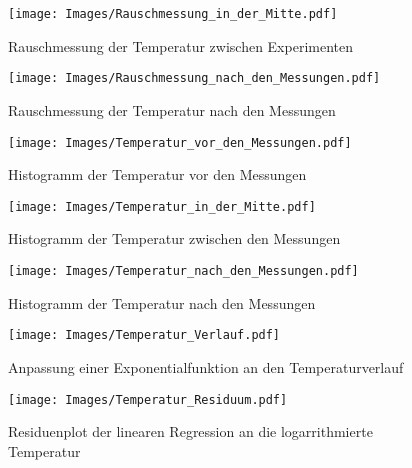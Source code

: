 \documentclass[]{article}
\begin{document}
	\begin{figure}
	\begin{center}
		\texttt{[image: Images/Rauschmessung\_in\_der\_Mitte.pdf]}
		\caption{Rauschmessung der Temperatur zwischen Experimenten}
		\label{Temp_mitte}
	\end{center}
	\end{figure}

	\begin{figure}
	\begin{center}
		\texttt{[image: Images/Rauschmessung\_nach\_den\_Messungen.pdf]}
		\caption{Rauschmessung der Temperatur nach den Messungen}
		\label{Temp_hinten}
	\end{center}
	\end{figure}

	\begin{figure}
	\begin{center}
		\texttt{[image: Images/Temperatur\_vor\_den\_Messungen.pdf]}
		\caption{Histogramm der Temperatur vor den Messungen}
		\label{Temp_vorn_hist}
	\end{center}
	\end{figure}

	\begin{figure}
	\begin{center}
		\texttt{[image: Images/Temperatur\_in\_der\_Mitte.pdf]}
		\caption{Histogramm der Temperatur zwischen den Messungen}
		\label{Temp_mitte_hist}
	\end{center}
	\end{figure}

	\begin{figure}
	\begin{center}
		\texttt{[image: Images/Temperatur\_nach\_den\_Messungen.pdf]}
		\caption{Histogramm der Temperatur nach den Messungen}
		\label{Temp_hinten_hist}
	\end{center}
	\end{figure}

	\begin{figure}
	\begin{center}
		\texttt{[image: Images/Temperatur\_Verlauf.pdf]}
		\caption{Anpassung einer Exponentialfunktion an den Temperaturverlauf}
		\label{Temp_Fit}
	\end{center}
	\end{figure}

	\begin{figure}
	\begin{center}
		\texttt{[image: Images/Temperatur\_Residuum.pdf]}
		\caption{Residuenplot der linearen Regression an die logarrithmierte Temperatur}
		\label{Temp_Res}
	\end{center}
	\end{figure}




	
\end{document}
